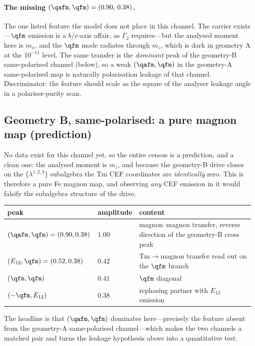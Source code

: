 \paragraph{The missing $(\qafm,\qfm)=(0.90,\,0.38)$.}
The one listed feature the model does not place in this channel.  The
carrier exists---$\qfm$ emission is a $b$/$c$-axis affair, as
$\Gamma_2$ requires---but the analysed moment here is $m_x$, and the
$\qfm$ mode radiates through $m_z$, which is dark in geometry A at the
$10^{-11}$ level.  The same transfer is the \emph{dominant} peak of the
geometry-B same-polarised channel (below), so a weak
$(\qafm,\qfm)$ in the geometry-A same-polarised map is naturally
polarisation leakage of that channel.  Discriminator: the feature
should scale as the square of the analyser leakage angle in a
polariser-purity scan.

\subsection{Geometry B, same-polarised: a pure magnon map (prediction)}
\label{si:peaksBsame}

No data exist for this channel yet, so the entire census is a
prediction, and a clean one: the analysed moment is $m_z$, and because
the geometry-B drive closes on the $\{\lambda^{1,2,3}\}$ subalgebra the
Tm CEF coordinates are \emph{identically} zero.  This is therefore a
pure Fe magnon map, and observing \emph{any} CEF emission in it would
falsify the subalgebra structure of the drive.
\begin{center}\small
\renewcommand{\arraystretch}{1.25}
\begin{tabular}{lll}
\toprule
peak & amplitude & content\\
\midrule
$(\qafm,\qfm)=(0.90,0.38)$ & $1.00$ & magnon--magnon transfer, reverse
  direction of the geometry-B cross peak\\
$(E_{12},\qfm)=(0.52,0.38)$ & $0.42$ & Tm$\to$magnon transfer read out
  on the $\qfm$ branch\\
$(\qfm,\qfm)$ & $0.41$ & $\qfm$ diagonal\\
$(-\qfm,E_{12})$ & $0.38$ & rephasing partner with $E_{12}$ emission\\
\bottomrule
\end{tabular}
\end{center}
The headline is that $(\qafm,\qfm)$ dominates here---precisely the
feature absent from the geometry-A same-polarised channel---which makes
the two channels a matched pair and turns the leakage hypothesis above
into a quantitative test.
